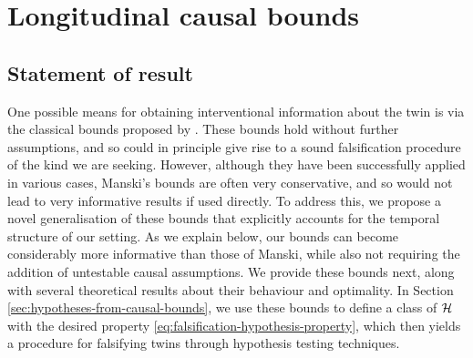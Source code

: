 







\section{Longitudinal causal bounds} \label{sec:causal-bounds}

\subsection{Statement of result} \label{sec:causal-bounds-statement}

One possible means for obtaining interventional information about the twin is via the classical bounds proposed by \cite{manski}.
These bounds hold without further assumptions, and so could in principle give rise to a sound falsification procedure of the kind we are seeking.
However, although they have been successfully applied in various cases, Manski's bounds are often very conservative, and so would not lead to very informative results if used directly.
To address this, we propose a novel generalisation of these bounds that explicitly accounts for the temporal structure of our setting.
As we explain below, our bounds can become considerably more informative than those of Manski, while also not requiring the addition of untestable causal assumptions.
We provide these bounds next, along with several theoretical results about their behaviour and optimality.
In Section \ref{sec:hypotheses-from-causal-bounds}, we use these bounds to define a class of $\mathcal{H}$ with the desired property \eqref{eq:falsification-hypothesis-property}, which then yields a procedure for falsifying twins through hypothesis testing techniques.



